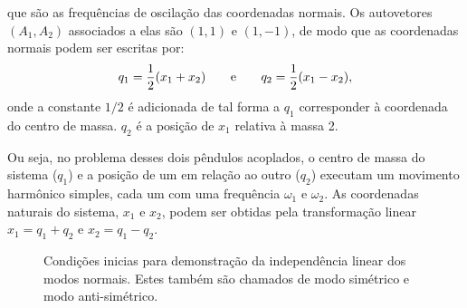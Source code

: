 \documentclass[a4paper, 11pt]{article}
\begin{document}
que são as frequências de oscilação das coordenadas normais. Os autovetores $(A_1,A_2)$ associados a elas são $(1,1)$ e $(1,-1)$, de modo que as coordenadas normais podem ser escritas por:
	\begin{equation}
	q_1 = \dfrac{1}{2}(x_1+x_2) \hspace{0.7cm}\text{e}\hspace{0.7cm} 	q_2 = \dfrac{1}{2}(x_1 - x_2),
	\end{equation}
onde a constante $1/2$ é adicionada de tal forma a $q_1$ corresponder à coordenada do centro de massa.
$q_2$ é a posição de $x_1$ relativa à massa 2.

	Ou seja, no problema desses dois pêndulos acoplados, o centro de massa do sistema ($q_1$) e a posição de um em relação ao outro ($q_2$) executam um movimento harmônico simples, cada um com uma frequência $\omega_1$ e $\omega_2$. As coordenadas naturais do sistema, $x_1$ e $x_2$, podem ser obtidas pela transformação linear $x_1=q_1+q_2$ e $x_2 = q_1-q_2$. 

    \begin{figure}[h!]
        \centering
        \caption{Condições inicias para demonstração da independência linear dos modos normais. Estes também são chamados de modo simétrico e modo anti-simétrico.
        \label{figura :: condições iniciais}}
    \end{figure}
\end{document}
